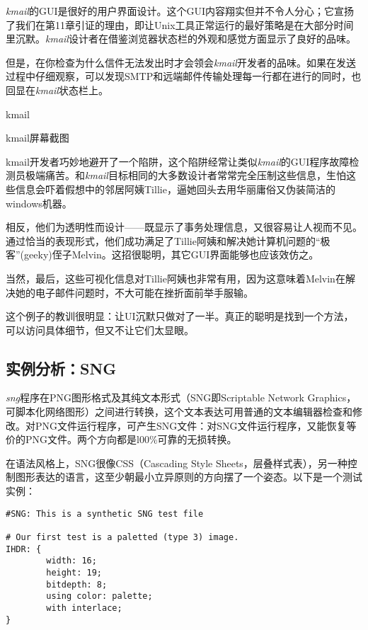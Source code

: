 \documentclass[12pt,oneside]{ctexbook}
\begin{document}
\begin{common-format}
\textit{kmail}的GUI是很好的用户界面设计。这个GUI内容翔实但并不令人分心；它宣扬了我们在第11章引证的理由，即让Unix工具正常运行的最好策略是在大部分时间里沉默。\textit{kmail}设计者在借鉴浏览器状态栏的外观和感觉方面显示了良好的品味。

但是，在你检查为什么信件无法发出时才会领会\textit{kmail}开发者的品味。如果在发送过程中仔细观察，可以发现SMTP和远端邮件传输处理每一行都在进行的同时，也回显在\textit{kmail}状态栏上。

\begin{linefig}{kmail}
\caption{kmail屏幕截图}
\label{fig:kmail}
\end{linefig}

kmail开发者巧妙地避开了一个陷阱，这个陷阱经常让类似\textit{kmail}的GUI程序故障检测员极端痛苦。和\textit{kmail}目标相同的大多数设计者常常完全压制这些信息，生怕这些信息会吓着假想中的邻居阿姨Tillie，逼她回头去用华丽庸俗又伪装简洁的windows机器。

相反，他们为透明性而设计——既显示了事务处理信息，又很容易让人视而不见。通过恰当的表现形式，他们成功满足了Tillie阿姨和解决她计算机问题的“极客”(geeky)侄子Melvin。这招很聪明，其它GUI界面能够也应该效仿之。

当然，最后，这些可视化信息对Tillie阿姨也非常有用，因为这意味着Melvin在解决她的电子邮件问题时，不大可能在挫折面前举手服输。

这个例子的教训很明显：让UI沉默只做对了一半。真正的聪明是找到一个方法，可以访问具体细节，但又不让它们太显眼。



\subsection{实例分析：SNG}
\textit{sng}程序在PNG图形格式及其纯文本形式（SNG即Scriptable Network Graphics，可脚本化网络图形）之间进行转换，这个文本表达可用普通的文本编辑器检查和修改。对PNG文件运行程序，可产生SNG文件：对SNG文件运行程序，又能恢复等价的PNG文件。两个方向都是l00\%{}可靠的无损转换。

在语法风格上，SNG很像CSS（Cascading Style Sheets，层叠样式表），另一种控制图形表达的语言，这至少朝最小立异原则的方向摆了一个姿态。以下是一个测试实例：

\begin{Verbatim}[label=例6.2  SNG实例]
#SNG: This is a synthetic SNG test file

# Our first test is a paletted (type 3) image.
IHDR: {
        width: 16;
        height: 19;
        bitdepth: 8;
        using color: palette;
        with interlace;
}


\end{Verbatim}
\end{common-format}
\end{document}
